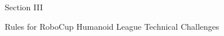 \documentclass[a4paper]{article}
\begin{document}




\clearpage

\begin{center}
\Huge\bfseries{
\vspace*{3cm}
Section III

\vspace*{2cm}

Rules for RoboCup Humanoid League Technical Challenges}
\end{center}








\end{document}

